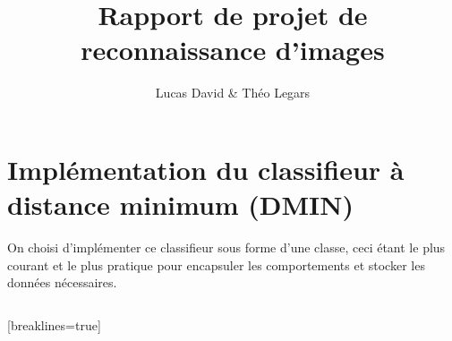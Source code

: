 \documentclass[12pt,a4paper]{article}
\author{Lucas David \& Théo Legars}
\title{Rapport de projet de reconnaissance d'images}
\date{}
\begin{document}
\maketitle

\section{Implémentation du classifieur à distance minimum (DMIN)}

On choisi d'implémenter ce classifieur sous forme d'une classe, ceci étant le plus courant et le plus pratique pour encapsuler les comportements et stocker les données nécessaires.

\inputminted{python}{../dmin.py}[breaklines=true]
\end{document}
